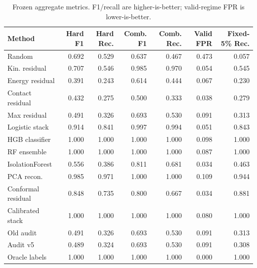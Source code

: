 \begin{table}[t]
\centering
\caption{Frozen aggregate metrics. F1/recall are higher-is-better; valid-regime FPR is lower-is-better.}
\label{tab:aggregate-main}
\scriptsize
\setlength{\tabcolsep}{2.5pt}
\begin{tabular}{lrrrrrr}
\toprule
Method & Hard F1 & Hard Rec. & Comb. F1 & Comb. Rec. & Valid FPR & Fixed-5\% Rec. \\
\midrule
Random & 0.692 & 0.529 & 0.637 & 0.467 & 0.473 & 0.057 \\
Kin. residual & 0.707 & 0.546 & 0.985 & 0.970 & 0.054 & 0.545 \\
Energy residual & 0.391 & 0.243 & 0.614 & 0.444 & 0.067 & 0.230 \\
Contact residual & 0.432 & 0.275 & 0.500 & 0.333 & 0.038 & 0.279 \\
Max residual & 0.491 & 0.326 & 0.693 & 0.530 & 0.091 & 0.313 \\
Logistic stack & 0.914 & 0.841 & 0.997 & 0.994 & 0.051 & 0.843 \\
HGB classifier & 1.000 & 1.000 & 1.000 & 1.000 & 0.098 & 1.000 \\
RF ensemble & 1.000 & 1.000 & 1.000 & 1.000 & 0.087 & 1.000 \\
IsolationForest & 0.556 & 0.386 & 0.811 & 0.681 & 0.034 & 0.463 \\
PCA recon. & 0.985 & 0.971 & 1.000 & 1.000 & 0.109 & 0.944 \\
Conformal residual & 0.848 & 0.735 & 0.800 & 0.667 & 0.034 & 0.881 \\
Calibrated stack & 1.000 & 1.000 & 1.000 & 1.000 & 0.080 & 1.000 \\
Old audit & 0.491 & 0.326 & 0.693 & 0.530 & 0.091 & 0.313 \\
Audit v5 & 0.489 & 0.324 & 0.693 & 0.530 & 0.091 & 0.308 \\
Oracle labels & 1.000 & 1.000 & 1.000 & 1.000 & 0.000 & 1.000 \\
\bottomrule
\end{tabular}
\end{table}
